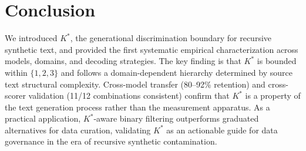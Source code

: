 \documentclass[11pt,a4paper]{article}
\newcommand{\Kstar}{K^{*}}
\begin{document}
\section{Conclusion}
\label{sec:conclusion}

We introduced $\Kstar$, the generational discrimination boundary for recursive synthetic text, and provided the first systematic empirical characterization across models, domains, and decoding strategies. The key finding is that $\Kstar$ is bounded within $\{1, 2, 3\}$ and follows a domain-dependent hierarchy determined by source text structural complexity. Cross-model transfer (80--92\% retention) and cross-scorer validation (11/12 combinations consistent) confirm that $\Kstar$ is a property of the text generation process rather than the measurement apparatus. As a practical application, $\Kstar$-aware binary filtering outperforms graduated alternatives for data curation, validating $\Kstar$ as an actionable guide for data governance in the era of recursive synthetic contamination.

\end{document}
